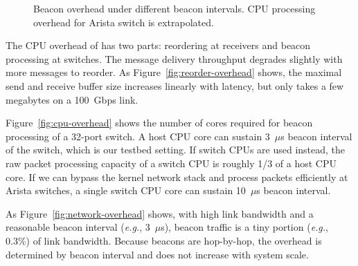 \begin{figure}[t]
	\centering
	\hspace{0.01\textwidth}
	\caption{
		Beacon overhead under different beacon intervals.
		CPU processing overhead for Arista switch is extrapolated.
	}
	\label{fig:overhead}
\end{figure}


The CPU overhead of \sys has two parts: reordering at receivers and beacon processing at switches.
The message delivery throughput degrades slightly with more messages to reorder.
As Figure~\ref{fig:reorder-overhead} shows, the maximal send and receive buffer size increases linearly with latency, but only takes a few megabytes on a 100~Gbps link.

Figure~\ref{fig:cpu-overhead} shows the number of cores required for beacon processing of a 32-port switch.
A host CPU core can sustain 3~$\mu$s beacon interval of the switch, which is our testbed setting.
If switch CPUs are used instead, the raw packet processing capacity of a switch CPU is roughly 1/3 of a host CPU core.
If we can bypass the kernel network stack and process packets efficiently at Arista switches, a single switch CPU core can sustain 10~$\mu$s beacon interval.


As Figure~\ref{fig:network-overhead} shows, with high link bandwidth and a reasonable beacon interval (\emph{e.g.}, 3~$\mu$s), beacon traffic is a tiny portion (\emph{e.g.}, 0.3\%) of link bandwidth. Because beacons are hop-by-hop, the overhead is determined by beacon interval and does not increase with system scale.



